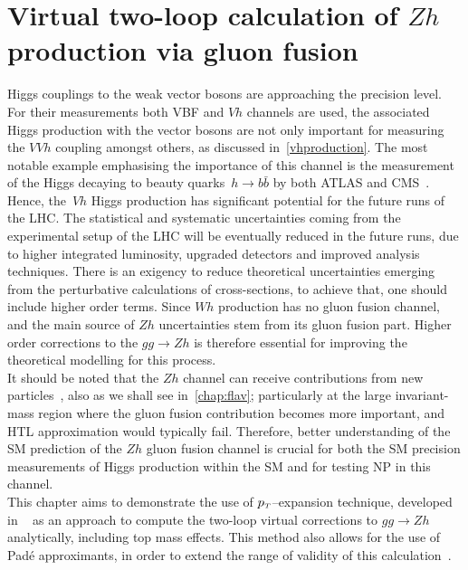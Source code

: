 \chapter{ Virtual two-loop calculation of  $Zh$ production via gluon fusion}\label{chap:hz}
\par  Higgs couplings to the weak vector bosons are approaching the precision level. For their measurements both VBF and $Vh$ channels are used, the associated Higgs production with the vector bosons are not only important for measuring the $VVh$ coupling amongst others, as discussed in~\autoref{vhproduction}. The most notable example emphasising the importance of this channel is the measurement of the Higgs decaying to beauty quarks~$h \rightarrow b \bar{b}$ by both ATLAS and CMS~\cite{Aaboud:2018zhk, Sirunyan:2018kst}. Hence, the~$Vh$ Higgs production has significant potential for the future runs of the LHC. The statistical and systematic uncertainties coming from the experimental setup of the LHC will be eventually reduced in the future runs, due to higher integrated luminosity,  upgraded detectors and improved analysis techniques. There is an exigency to reduce theoretical uncertainties emerging from the perturbative calculations of  cross-sections,  to achieve that, one should include higher order terms. Since $Wh$ production has no gluon fusion channel, and the main source of $Zh$ uncertainties stem from its gluon fusion part. Higher order corrections to the $gg \to Zh$ is therefore essential for improving the theoretical modelling for this process. \\ 
It should be noted that the $Zh$ channel can receive contributions from new particles~\cite{Harlander:2013mla}, also as we shall see in~\autoref{chap:flav}; particularly at the large invariant-mass region where the gluon fusion contribution becomes more important, and HTL approximation would typically fail. Therefore, better understanding of the SM prediction of the $Zh$ gluon fusion channel is crucial for both the SM precision measurements of Higgs production within the SM and for testing NP in this channel.  \\ This chapter aims to demonstrate the use of $p_{\scriptscriptstyle T}$--expansion technique, developed in ~\cite{Bonciani:2018omm} as an approach to compute the two-loop virtual corrections to $gg \to Zh$ analytically, including top mass effects. This method also allows for the use of  Pad\'e approximants, in order to extend the range of validity of this calculation~\cite{Bellafronte:2022jmo}.

